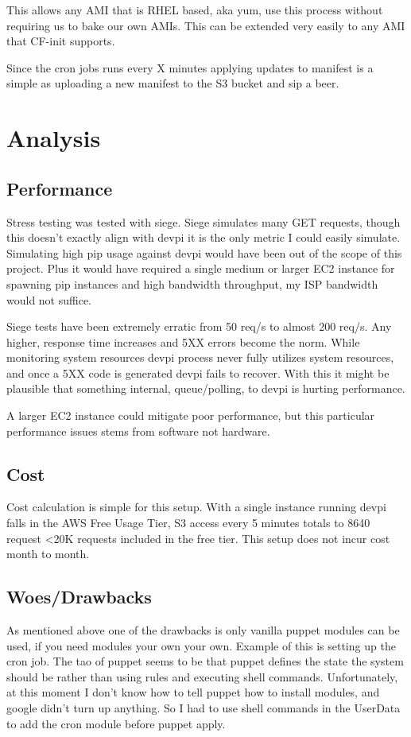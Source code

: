 \documentclass[12pt, letterpaper]{article}
\begin{document}
This allows any AMI that is RHEL based, aka yum, use this process without requiring us to bake our own AMIs. This can
be extended very easily to any AMI that CF-init supports.

Since the cron jobs runs every X minutes applying updates to manifest is a simple as uploading a new manifest to the S3 bucket
and sip a beer.



\section{Analysis}
\subsection{Performance}
Stress testing was tested with siege. Siege simulates many GET requests, though this doesn't exactly align with devpi it is the only 
metric I could easily simulate. Simulating high pip usage against devpi would have been out of the scope of this project. Plus it
would have required a single medium or larger EC2 instance for spawning pip instances and high bandwidth throughput, my ISP bandwidth
would not suffice.

Siege tests have been extremely erratic from 50 req/s to almost 200 req/s. Any higher, response time increases and 5XX errors become
the norm. While monitoring system resources devpi process never fully utilizes system resources, and once a 5XX code is generated 
devpi fails to recover. With this it might be plausible that something internal, queue/polling, to devpi is hurting performance.

A larger EC2 instance could mitigate poor performance, but this particular performance issues stems from software not hardware.

\subsection{Cost}
Cost calculation is simple for this setup. With a single instance running devpi falls in the AWS Free Usage Tier, S3 access every
5 minutes totals to 8640 request \textless 20K requests included in the free tier. This setup does not incur cost month to month.

\subsection{Woes/Drawbacks}
As mentioned above one of the drawbacks is only vanilla puppet modules can be used, if you need modules your own your own.
Example of this is setting up the cron job. The tao of puppet seems to be that puppet defines the state the system should
be rather than using rules and executing shell commands. Unfortunately, at this moment I don't know how to tell puppet how
to install modules, and google didn't turn up anything. So I had to use shell commands in the UserData to add the cron module
before puppet apply.
\end{document}
